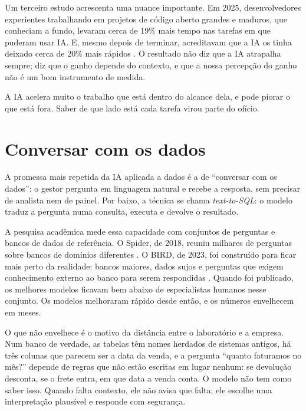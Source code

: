 Um terceiro estudo acrescenta uma nuance importante. Em 2025, desenvolvedores experientes
trabalhando em projetos de código aberto grandes e maduros, que conheciam a fundo,
levaram cerca de 19\% mais tempo nas tarefas em que puderam usar IA. E, mesmo depois de
terminar, acreditavam que a IA os tinha deixado cerca de 20\% mais rápidos
\parencite{becker2025}. O resultado não diz que a IA atrapalha sempre; diz que o ganho
depende do contexto, e que a nossa percepção do ganho não é um bom instrumento de
medida.

\begin{destaque}
A IA acelera muito o trabalho que está dentro do alcance dela, e pode piorar o que está
fora. Saber de que lado está cada tarefa virou parte do ofício.
\end{destaque}


\section{Conversar com os dados}
\label{sec:text-to-sql}

A promessa mais repetida da IA aplicada a dados é a de \enquote{conversar com os
dados}: o gestor pergunta em linguagem natural e recebe a resposta, sem precisar de
analista nem de painel. Por baixo, a técnica se chama \emph{text-to-SQL}: o modelo
traduz a pergunta numa consulta, executa e devolve o resultado.

A pesquisa acadêmica mede essa capacidade com conjuntos de perguntas e bancos de dados
de referência. O Spider, de 2018, reuniu milhares de perguntas sobre bancos de domínios
diferentes \parencite{yu2018}. O BIRD, de 2023, foi construído para ficar mais perto da
realidade: bancos maiores, dados sujos e perguntas que exigem conhecimento externo ao
banco para serem respondidas \parencite{li2023bird}. Quando foi publicado, os melhores
modelos ficavam bem abaixo de especialistas humanos nesse conjunto. Os modelos
melhoraram rápido desde então, e os números envelhecem em meses.

O que não envelhece é o motivo da distância entre o laboratório e a empresa. Num banco
de verdade, as tabelas têm nomes herdados de sistemas antigos, há três colunas que
parecem ser a data da venda, e a pergunta \enquote{quanto faturamos no mês?} depende de
regras que não estão escritas em lugar nenhum: se devolução desconta, se o frete entra,
em que data a venda conta. O modelo não tem como saber isso. Quando falta contexto, ele
não avisa que falta; ele escolhe uma interpretação plausível e responde com segurança.


